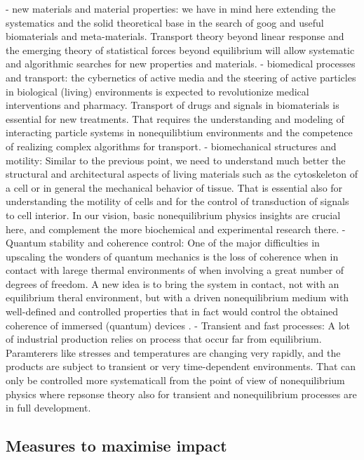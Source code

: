 - new materials and material properties: we have in mind here extending the systematics and the solid theoretical base in the search of goog and useful biomaterials and meta-materials.  Transport theory beyond linear response and the emerging theory of statistical forces beyond equilibrium will allow systematic and algorithmic searches for new properties and materials.
- biomedical processes and transport:  the cybernetics of active media and the steering of active particles in biological (living) environments is expected to revolutionize medical interventions and pharmacy.  Transport of drugs and signals in biomaterials is essential for new treatments.  That requires the understanding and modeling of interacting particle systems in nonequilibtium environments and the competence of realizing complex algorithms for transport.
- biomechanical structures and motility: Similar to the previous point, we need to understand much better the structural and architectural aspects of living materials such as the cytoskeleton of a cell or in general the mechanical behavior of tissue.  That is essential also for understanding the motility of cells and for the control of transduction of signals to cell interior.  In our vision, basic nonequilibrium physics insights are crucial here, and complement the more biochemical and experimental research there.
- Quantum stability and coherence control: One of the major difficulties in upscaling the wonders of quantum mechanics is the loss of coherence when in contact with larege thermal environments of when involving a great number of degrees of freedom.  A new idea is to bring the system in contact, not with an equilibrium theral environment, but with a driven nonequilibrium medium with well-defined and controlled properties that in fact would control the obtained coherence of immersed (quantum) devices .
- Transient and fast processes: A lot of industrial production relies on process that occur far from equilibrium.  Paramterers like stresses and temperatures are changing very rapidly, and the products are subject to transient or very time-dependent environments. That can only be controlled more systematicall from the point of view of nonequilibrium physics where repsonse theory also for transient and nonequilibrium processes are in full development.




\subsection{Measures to maximise impact}

